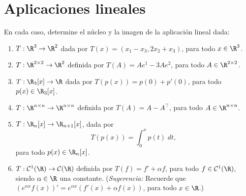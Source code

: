 \documentclass[a4,11pt]{aleph-notas}
\begin{document}
\encabezado


\section{Aplicaciones lineales}

\begin{ejer}
    En cada caso, determine el núcleo y la imagen de la aplicación lineal dada:
    \begin{enumerate}
        \item $T:\R^3\to\R^2$ dada por $T(x) = (x_1-x_3,2x_2+x_3)$, para todo $x\in\R^3$.
        \item $T:\R^{2\times 2} \to \R^2$ definida por $T(A)=Ae^{1} - 3Ae^2$, para todo $A\in\R^{2\times 2}$.
        \item $T:\R_3[x]\to \R$ dada por $T(p(x))=p(0) + p'(0)$, para todo $p(x)\in\R_3[x]$.
        \item $T:\R^{n\times n}\to \R^{n\times n}$ definida por $T(A)=A-A^\intercal$, para todo $A\in\R^{n\times n}$.
        \item $T:\R_n[x]\to \R_{n+1}[x]$, dada por
        \[
            T(p(x)) = \int_0^x p(t)\; dt,
        \]
        para todo $p(x)\in \R_n[x]$.
        \item $T:\mathcal{C}^1(\R)\to\mathcal{C}(\R)$ definida por $T(f)=f' + \alpha f$, para todo $f\in\mathcal{C}^1(\R)$, siendo $\alpha\in \R$ una constante. (\emph{Sugerencia:} Recuerde que $(e^{\alpha x}f(x))' = e^{\alpha x}(f'(x) + \alpha f(x))$, para todo $x\in\R$.)
    \end{enumerate}
\end{ejer}
\end{document}

